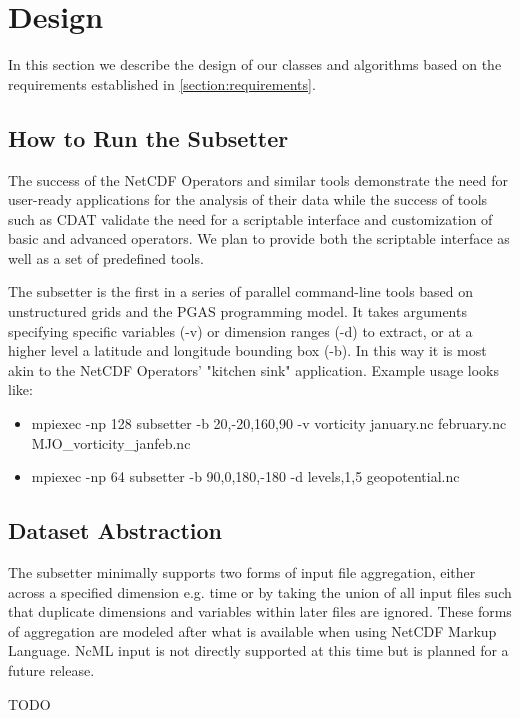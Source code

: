 \section{Design}
\label{section:design}

In this section we describe the design of our classes and algorithms based on
the requirements established in \ref{section:requirements}.

\subsection{How to Run the Subsetter}

The success of the NetCDF Operators and similar tools demonstrate the need for
user-ready applications for the analysis of their data while the success of
tools such as CDAT validate the need for a scriptable interface and customization of
basic and advanced operators.  We plan to provide both the scriptable
interface as well as a set of predefined tools.

The subsetter is the first in a series of parallel command-line tools based on
unstructured grids and the PGAS programming model.  It takes arguments
specifying specific variables (-v) or dimension ranges (-d) to extract, or at
a higher level a latitude and longitude bounding box (-b).  In this way it is
most akin to the NetCDF Operators' "kitchen sink" application.  Example usage
looks like:
\begin{itemize}
\item mpiexec -np 128 subsetter -b 20,-20,160,90 -v vorticity january.nc february.nc MJO\_vorticity\_janfeb.nc
\item mpiexec -np 64 subsetter -b 90,0,180,-180 -d levels,1,5 geopotential.nc
\end{itemize}

\subsection{Dataset Abstraction}

The subsetter minimally supports two forms of input file aggregation, either
across a specified dimension e.g. time or by taking the union of all input
files such that duplicate dimensions and variables within later files are
ignored.  These forms of aggregation are modeled after what is available when
using NetCDF Markup Language.\cite{NcML} NcML input is not directly supported
at this time but is planned for a future release. 

TODO

